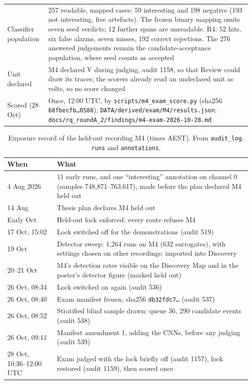 \begin{table}[htbp]
\begin{tabularx}{\textwidth}{p{3.4cm} X}
Classifier population & 257 readable, mapped cases: 59 interesting and 198 negative (193 not interesting, five artefacts). The frozen binary mapping omits seven seed verdicts; 12 further spans are unreadable. R4: 52 hits, six false alarms, seven misses, 192 correct rejections. The 276 answered judgements remain the candidate-acceptance population, where seed counts as accepted\\
Unit declared & M4 declared V during judging, audit 1158, so that Review could draw its traces; the scorers already read an undeclared unit as volts, so no score changed\\
Scored (28 Oct) & Once, 12:00 UTC, by \texttt{scripts/m4\_exam\_score.py} (sha256 \texttt{68fbecfb\ldots0588}); \texttt{DATA/derived/exam/M4/results.json}; \texttt{docs/rq\_roundA\_2/findings/m4-exam-2026-10-28.md}\\
\bottomrule
\end{tabularx}
\end{table}

\begin{table}[htbp]
\caption[{Exposure record of the held-out recording M4 (times AEST).}]{Exposure record of the held-out recording M4 (times AEST). From \texttt{audit\_log}, \texttt{runs} and \texttt{annotations}.}
\label{tab:exposure}
\small
\begin{tabularx}{\textwidth}{p{3.3cm} X}
\toprule
\textbf{When} & \textbf{What}\\
\midrule
4 Aug 2026 & 11 early runs, and one ``interesting'' annotation on channel 0 (samples 748,871--763,617), made before the plan declared M4 held out\\
14 Aug & Thesis plan declares M4 held out\\
Early Oct & Held-out lock enforced: every route refuses M4\\
17 Oct, 15:02 & Lock switched off for the demonstrations (audit 519)\\
19 Oct & Detector sweep: 1,264 runs on M4 (632 surrogates), with settings chosen on other recordings; imported into Discovery\\
20--21 Oct & M4's detection rates visible on the Discovery Map and in the poster's detector figure (marked held out)\\
26 Oct, 08:34 & Lock switched on again (audit 536)\\
26 Oct, 08:40 & Exam manifest frozen, sha256 \texttt{db32fdc7\ldots} (audit 537)\\
26 Oct, 08:52 & Stratified blind sample drawn: queue 36, 290 candidate events (audit 538)\\
26 Oct, 09:11 & Manifest amendment 1, adding the CNNs, before any judging (audit 539)\\
28 Oct, 10:36--12:00 UTC & Exam judged with the lock briefly off (audit 1157), lock restored (audit 1159), then scored once\\
\bottomrule
\end{tabularx}
\end{table}
